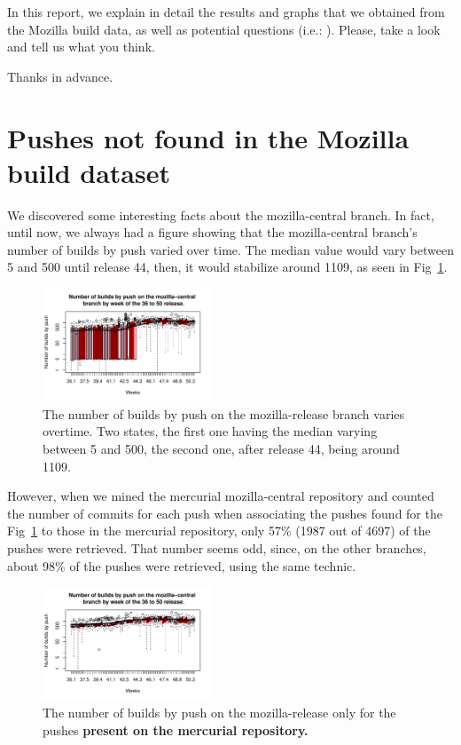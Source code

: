 
In this report, we explain in detail the results and graphs that we obtained from the Mozilla build data, as well as potential questions (i.e.: ). Please, take a look and tell us what you think.

Thanks in advance.

\section{\label{KYLE} Pushes not found in the Mozilla build dataset}

We discovered some interesting facts about the mozilla-central branch. In fact, until now, we always had a figure showing that the mozilla-central branch's number of builds by push varied over time. The median value would vary between 5 and 500 until release 44, then, it would stabilize around 1109, as seen in Fig~\ref{build_push_mozilla_central_alone}.

\begin{figure}[!h]
    \centering
    \includegraphics[width=0.45\textwidth]{img/build_push_mozilla_central.pdf}
    \caption{The number of builds by push on the mozilla-release branch varies overtime. Two states, the first one having the median varying between 5 and 500, the second one, after release 44, being around 1109.}
    \label{build_push_mozilla_central_alone}
\end{figure}

However, when we mined the mercurial mozilla-central repository and counted the number of commits for each push when associating the pushes found for the Fig~\ref{build_push_mozilla_central_alone} to those in the mercurial repository, only 57\% (1987 out of 4697) of the pushes were retrieved. That number seems odd, since, on the other branches, about 98\% of the pushes were retrieved, using the same technic.

\begin{figure}[!h]
    \centering
    \includegraphics[width=0.45\textwidth]{img/build_push_MERCURIAL_mozilla_central.pdf}
    \caption{The number of builds by push on the mozilla-release only for the pushes \textbf{present on the mercurial repository.}}
    \label{build_push_MERCURIAL_mozilla_central_alone}
\end{figure}

